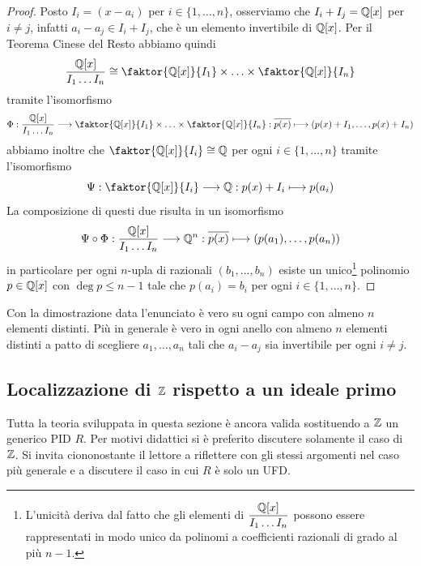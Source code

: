 \documentclass[11pt]{scrartcl}
\begin{document}
	\begin{proof}
		Posto $I_i = (x - a_i)$ per $i \in \{1, \ldots, n\}$, osserviamo che 
		$I_i + I_j = \mathbb Q[x]$ per $i \neq j$, infatti $a_i - a_j \in I_i + I_j$, 
		che è un elemento invertibile di $\mathbb Q[x]$. Per il Teorema Cinese del Resto
		abbiamo quindi
		\[
		\frac{\QQ[x]}{I_1\ldots I_n} \cong \faktor{\QQ[x]}{I_1}\times 
		\ldots \times \faktor{\QQ[x]}{I_n}
		\]
		tramite l'isomorfismo
		\[
		\Phi: \frac{\QQ[x]}{I_1\ldots I_n} \longrightarrow \faktor{\QQ[x]}{I_1}\times 
		\ldots \times \faktor{\QQ[x]}{I_n}: \overline{p(x)}\longmapsto
		(p(x) + I_1, \ldots, p(x) + I_n)
		\]
		abbiamo inoltre che $\faktor{\QQ[x]}{I_i} \cong \QQ$ per ogni $i \in \{1, \ldots, n\}$
		tramite l'isomorfismo
		\[
		\Psi: \faktor{\QQ[x]}{I_i} \longrightarrow \QQ: p(x) + I_i \longmapsto p(a_i)
		\]
		La composizione di questi due risulta in un isomorfismo
		\[
		\Psi\circ\Phi: \frac{\mathbb Q[x]}{I_1\ldots I_n}\longrightarrow \mathbb Q^n:
		\overline{p(x)}\longmapsto (p(a_1), \ldots, p(a_n))
		\]
		in particolare per ogni $n$-upla di razionali $(b_1, \ldots, b_n)$ esiste
		un unico\footnote{
			L'unicità deriva dal fatto che gli elementi di $\displaystyle\frac{\mathbb Q[x]}{I_1\ldots I_n}$
			possono essere rappresentati in modo unico da polinomi a coefficienti 
			razionali di grado al più $n - 1$.
		} polinomio $p \in \mathbb Q[x]$ con $\deg p \leq n - 1$ tale che 
		$p(a_i) = b_i$ per ogni $i \in \{1, \ldots, n\}$.
	\end{proof}
	
	\begin{remark}
		Con la dimostrazione data l'enunciato è vero su ogni campo con almeno 
		$n$ elementi distinti. Più in generale è vero in ogni anello con almeno $n$
		elementi distinti a patto di scegliere $a_1, \ldots, a_n$ tali che $a_i - a_j$
		sia invertibile per ogni $i \neq j$.
	\end{remark}
	
	\newpage
	
	\subsection{Localizzazione di \texorpdfstring{$\mathbb Z$}{ℤ} rispetto a un ideale primo}

	\begin{premessa*}
		Tutta la teoria sviluppata in questa sezione è ancora valida sostituendo a
		$\mathbb Z$ un generico PID $R$. Per motivi didattici si è preferito discutere
		solamente il caso di $\mathbb Z$. Si invita ciononostante il lettore a
		riflettere con gli stessi argomenti nel caso più generale e a discutere
		il caso in cui $R$ è solo un UFD.
	\end{premessa*}
\end{document}
